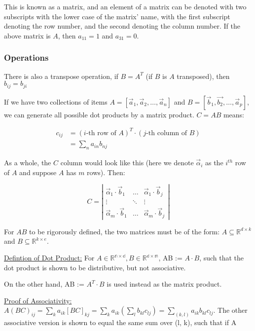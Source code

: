 \documentclass[11 pt, twoside]{article}
\begin{document}
This is known as a matrix, and an element of a matrix can be denoted with two
subscripts with the lower case of the matrix' name, with the first subscript denoting the row number, and the second denoting the
column number. If the above matrix is $A$, then $a_{11} = 1$ and $a_{31} = 0$.

\subsubsection{Operations}

There is also a transpose operation, if $B = A^T$ (if $B$ is $A$ transposed),
then $b_{ij} = b_{ji}$

If we have two collections of items $A = [\vec{a}_1, \vec{a}_2, \dots, \vec{a}_n]$
and $B = [\vec{b}_1, \vec{b_2}, \dots, \vec{a}_p]$, we can generate all possible
dot products by a matrix product. $C = AB$ means:

\begin{align*}
    c_{ij} &= (i\mbox{-th row of } A)^T \cdot (j\mbox{-th column of } B)\\
           &= \sum_n a_{in} b_{nj}
\end{align*}

As a whole, the $C$ column would look like this (here we denote $\vec{\alpha}_i$
as the $i^{th}$ row of $A$ and suppose $A$ has $m$ rows). Then:

\[
    C = \left|\begin{array}{ccc}
        \vec{\alpha}_1 \cdot \vec{b}_1 & \dots & \vec{\alpha}_1 \cdot
        \vec{b}_j\\
        \vdots & \ddots & \vdots\\
        \vec{\alpha}_m \cdot \vec{b}_1 & \dots & \vec{\alpha}_m \cdot
        \vec{b}_j
    \end{array}\right|
\]

For $AB$ to be rigorously defined, the two matrices must be of the form: $A \subseteq \mathbb{R}^{d\times k}$ and $B \subseteq \mathbb{R}^{k \times e}$.

\underline{Defintion of Dot Product:}
For $A \in \mathbb{R^{n \times d}}, B \in \mathbb{R^{d \times m}}$, AB := $A \cdot B$, such that the dot product is shown to be distributive, but not associative.

On the other hand, AB := $A^T \cdot B$ is used instead as the matrix product.

\underline{Proof of Associativity:}
$A(BC)_{ij} = \sum_k a_{ik}[BC]_{kj} = \sum_k a_{ik}(\sum_l b_{kl}c_{lj}) = \sum_{(k, l)} a_{ik}b_{kl}c_{lj}$. The other associative version is shown to equal the same sum over (l, k), such that if A \in \mathbb
\end{document}
